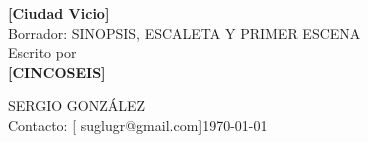 \begin{titlepage}
    
\RaggedRight

\thispagestyle{empty}
\vspace*{2.5in}
\begin{center}
    {\Huge \textbf{[Ciudad Vicio]}}\\[1cm]
    {\large Borrador: SINOPSIS, ESCALETA Y PRIMER ESCENA}\\[2cm]
    Escrito por\\
    \textbf{[CINCOSEIS]}
\end{center}

\vfill
\noindent SERGIO GONZÁLEZ\\
Contacto: [ suglugr@gmail.com]\hfill \today
\newpage
\newpage


\end{titlepage}